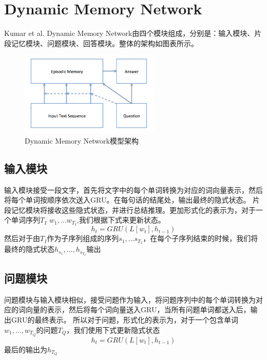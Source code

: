 \section{Dynamic Memory Network}
Kumar et al.\cite{DBLP:journals/corr/KumarISBEPOGS15} Dynamic Memory Network由四个模块组成，分别是：输入模块、片段记忆模块、问题模块、回答模块。整体的架构如图表所示。\\
\begin{figure}[h]
      \centering
        \includegraphics[width=0.6\textwidth]{./images/dynamic-memory-network-structure}
          \caption{Dynamic Memory Network模型架构}
      \end{figure} 
\subsection{输入模块}
输入模块接受一段文字，首先将文字中的每个单词转换为对应的词向量表示，然后将每个单词按顺序依次送入GRU。在每句话的结尾处，输出最终的隐式状态。
片段记忆模块将接收这些隐式状态，并进行总结推理。更加形式化的表示为，对于一个单词序列$T_I$ $w_1,...w_{T_I}$,我们根据下式来更新状态。\\
\begin{equation}
h_t = GRU(L[w_t],h_{t-1})
\end{equation}
然后对于由$T_I$作为子序列组成的序列$s_1,...s_{T_I}$，在每个子序列结束的时候，我们将最终的隐式状态$h_{s_1},...,h_{s_{T_I}}$输出
\subsection{问题模块}
问题模块与输入模块相似，接受问题作为输入，将问题序列中的每个单词转换为对应的词向量的表示，然后将每个词向量送入GRU，当所有问题单词都送入后，输出GRU的最终表示。
所以对于问题，形式化的表示为，对于一个包含单词$w_1,...,w_{T_Q}$的问题$T_Q$，我们使用下式更新隐式状态\\
\begin{equation}
h_t = GRU(L[w_t],h_{t-1})
\end{equation}
最后的输出为$h_{T_Q}$
